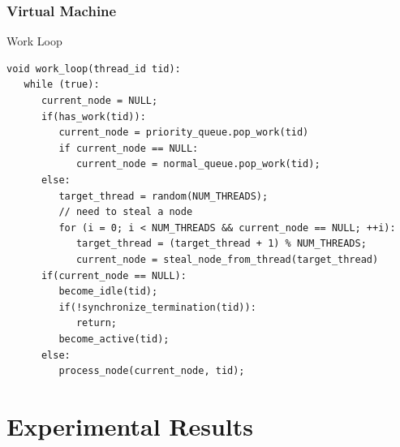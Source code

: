 \documentclass{beamer}
\begin{document}
\begin{frame}[fragile]
   \frametitle{Virtual Machine}
   \begin{block}{Work Loop}
   \scriptsize
\begin{verbatim}
void work_loop(thread_id tid):
   while (true):
      current_node = NULL;
      if(has_work(tid)):
         current_node = priority_queue.pop_work(tid)
         if current_node == NULL:
            current_node = normal_queue.pop_work(tid);
      else:
         target_thread = random(NUM_THREADS);
         // need to steal a node
         for (i = 0; i < NUM_THREADS && current_node == NULL; ++i):
            target_thread = (target_thread + 1) % NUM_THREADS;
            current_node = steal_node_from_thread(target_thread)
      if(current_node == NULL):
         become_idle(tid);
         if(!synchronize_termination(tid)):
            return;
         become_active(tid);
      else:
         process_node(current_node, tid);
   \end{verbatim}
   \end{block}
\end{frame}

\section{Experimental Results}
\end{document}
